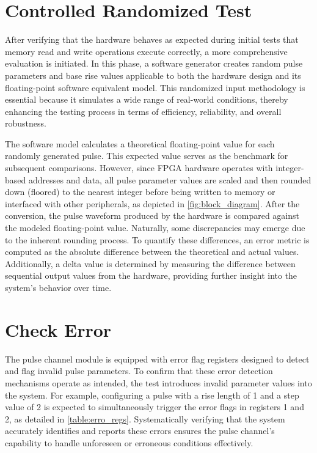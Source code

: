 \section{Controlled Randomized Test}

After verifying that the hardware behaves as expected during initial tests that memory read and write operations execute correctly, a more comprehensive evaluation is initiated. In this phase, a software generator creates random pulse parameters and base rise values applicable to both the hardware design and its floating-point software equivalent model. This randomized input methodology is essential because it simulates a wide range of real-world conditions, thereby enhancing the testing process in terms of efficiency, reliability, and overall robustness.

The software model calculates a theoretical floating-point value for each randomly generated pulse. This expected value serves as the benchmark for subsequent comparisons. However, since FPGA hardware operates with integer-based addresses and data, all pulse parameter values are scaled and then rounded down (floored) to the nearest integer before being written to memory or interfaced with other peripherals, as depicted in \autoref{fig:block_diagram}. After the conversion, the pulse waveform produced by the hardware is compared against the modeled floating-point value. Naturally, some discrepancies may emerge due to the inherent rounding process. To quantify these differences, an error metric is computed as the absolute difference between the theoretical and actual values. Additionally, a delta value is determined by measuring the difference between sequential output values from the hardware, providing further insight into the system's behavior over time. 

\section{Check Error}

The pulse channel module is equipped with error flag registers designed to detect and flag invalid pulse parameters. To confirm that these error detection mechanisms operate as intended, the test introduces invalid parameter values into the system. For example, configuring a pulse with a rise length of 1 and a step value of 2 is expected to simultaneously trigger the error flags in registers 1 and 2, as detailed in \autoref{table:erro_regs}. Systematically verifying that the system accurately identifies and reports these errors ensures the pulse channel's capability to handle unforeseen or erroneous conditions effectively. 
